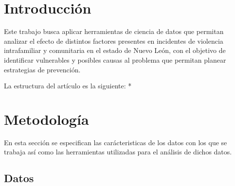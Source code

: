 \documentclass[final,5p,times]{elsarticle}
\begin{document}
\begin{frontmatter}
\begin{keyword}



\end{keyword}

\end{frontmatter}


\section{Introducci\'on} \label{intro}

Este trabajo busca aplicar herramientas de ciencia de datos que permitan analizar el efecto de distintos factores presentes en incidentes de violencia intrafamiliar y comunitaria en el estado de Nuevo Le\'on, con el objetivo de identificar vulnerables y posibles causas al problema que permitan planear estrategias de prevenci\'on.

La estructura del art\'iculo es la siguiente: * 



\section{Metodolog\'ia} \label{metodologia}

En esta secci\'on se especifican las car\'acteristicas de los datos con los que se trabaja as\'i como las herramientas utilizadas para el an\'alisis de dichos datos. 

\subsection{Datos}
\end{document}
